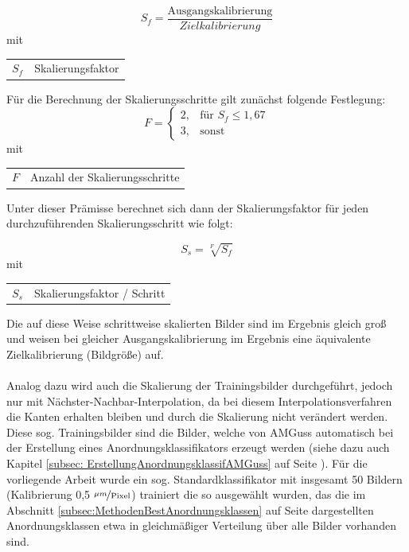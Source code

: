 \documentclass[
fontsize=10pt, 
listof = totoc,
parskip = half	
]{report}
\makeatletter
\newenvironment{conditions}
{\par\vspace{\abovedisplayskip}\noindent\begin{tabular}{>{$}l<{$} @{${}:{}$} l}}
	{\end{tabular}\par\vspace{\belowdisplayskip}}
\makeatother
\begin{document}
\begin{equation}
	S_f = \frac{\text{Ausgangskalibrierung}}{Zielkalibrierung}
\end{equation}
mit
\begin{conditions}
	S_f & Skalierungsfaktor
\end{conditions}

\noindent Für die Berechnung der Skalierungsschritte gilt zunächst folgende Festlegung:
\begin{equation}
	F = 
	\begin{cases}
		 2,		&	\text{für } S_f \leq 1,67\\
		 3, 	&	\text{sonst}
	\end{cases}
\end{equation}
mit
\begin{conditions}
	F & Anzahl der Skalierungsschritte
\end{conditions}

\noindent Unter dieser Prämisse berechnet sich dann der Skalierungsfaktor für jeden durchzuführenden Skalierungsschritt wie folgt:

\begin{equation}
	S_s = \sqrt[F]{S_f}
\end{equation}
mit
\begin{conditions}
	S_{s} & Skalierungsfaktor / Schritt
\end{conditions}

\noindent Die auf diese Weise schrittweise skalierten Bilder sind im Ergebnis gleich groß und weisen bei gleicher Ausgangskalibrierung im Ergebnis eine äquivalente Zielkalibrierung (Bildgröße) auf.
\\\\
\noindent Analog dazu wird auch die Skalierung der Trainingsbilder durchgeführt, jedoch nur mit Nächster-Nachbar-Interpolation, da bei diesem Interpolationsverfahren die Kanten erhalten bleiben und durch die Skalierung nicht verändert werden. Diese sog. Trainingsbilder sind die Bilder, welche von AMGuss automatisch bei der Erstellung eines Anordnungsklassifikators erzeugt werden (siehe dazu auch Kapitel \ref{subsec: ErstellungAnordnungsklassifAMGuss} auf Seite \pageref{subsec: ErstellungAnordnungsklassifAMGuss}). Für die vorliegende Arbeit wurde ein sog. Standardklassifikator mit insgesamt 50 Bildern (Kalibrierung 0,5 $\nicefrac{\mu m}{\text{Pixel}}$) trainiert die so ausgewählt wurden, das die im Abschnitt \ref{subsec:MethodenBestAnordnungsklassen} auf Seite \pageref{subsec:MethodenBestAnordnungsklassen} dargestellten Anordnungsklassen etwa in gleichmäßiger Verteilung über alle Bilder vorhanden sind.
\end{document}
